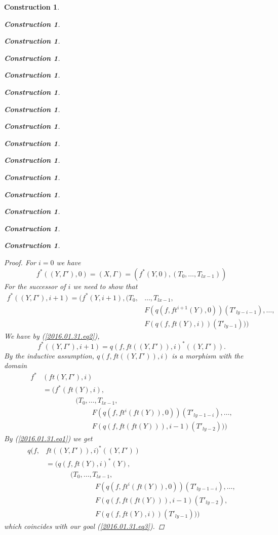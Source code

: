 \documentclass[onecolumn,12pt]{amsart}
\numberwithin{proposition}{subsection}
\newtheorem{construction}[proposition]{Construction}
\newcommand{\spc}{{\,\,\,\,\,\,\,}}
\begin{document}
\begin{construction}
\begin{construction}
\begin{construction}
\begin{construction}
\begin{construction}
\begin{construction}
\begin{construction}
\begin{construction}
\begin{construction}
\begin{construction}
\begin{construction}
\begin{construction}
\begin{construction}
\begin{construction}
\begin{construction}
\begin{proof}
For $i=0$ we have 
%
$$f^*((Y,\Gamma'),0)=(X,\Gamma)=(f^*(Y,0),(T_0,\dots,T_{lx-1}))$$
%
For the successor of $i$ we need to show that
%
\begin{equation}\label{2016.01.31.eq3}
  \begin{split}
    f^*((Y,\Gamma'),i+1)=(f^*(Y,i+1),(T_0,&\dots,T_{lx-1},
    \\
    &
    F(q(f,ft^{i+1}(Y),0))(T'_{ly-i-1}),\dots,
    \\
    &
    F(q(f,ft(Y),i))(T'_{ly-1})))
  \end{split}
\end{equation}%
%
We have by (\ref{2016.01.31.eq2}),  
%
$$f^*((Y,\Gamma'),i+1)=q(f,ft((Y,\Gamma')),i)^*((Y,\Gamma')).$$
%
By the inductive assumption, $q(f,ft((Y,\Gamma')),i)$ is a morphism with the domain
%
\begin{equation*}
  \begin{split}
    f^*&(ft(Y,\Gamma'),i)
    \\&=
    (f^*(ft(Y),i),
    \\&
       \spc\spc\spc\spc (T_0,\dots,T_{lx-1},
    \\&
          \spc\spc\spc\spc\spc\spc F(q(f,ft^{i}(ft(Y)),0))(T'_{ly-1-i}),\dots,
    \\&
          \spc\spc\spc\spc\spc\spc F(q(f,ft(ft(Y))),i-1)(T'_{ly-2})
          ))
  \end{split}
\end{equation*}
%
By (\ref{2016.01.31.eq1}) we get
%
\begin{equation*}
  \begin{split}
    q(f,&ft((Y,\Gamma')),i)^*((Y,\Gamma'))
    \\&=
    (q(f,ft(Y),i)^*(Y),
    \\&
    \spc\spc\spc (T_0,\dots,T_{lx-1},
    \\&
    \spc\spc\spc\spc\spc\spc F(q(f,ft^{i}(ft(Y)),0))(T'_{ly-1-i}),\dots,
    \\&
    \spc\spc\spc\spc\spc\spc F(q(f,ft(ft(Y))),i-1)(T'_{ly-2}),
    \\&
    \spc\spc\spc\spc\spc\spc F(q(f,ft(Y),i))(T'_{ly-1})))
  \end{split}
\end{equation*}
%
which coincides with our goal (\ref{2016.01.31.eq3}). 
\end{proof}
%


\end{construction}
\end{construction}
\end{construction}
\end{construction}
\end{construction}
\end{construction}
\end{construction}
\end{construction}
\end{construction}
\end{construction}
\end{construction}
\end{construction}
\end{construction}
\end{construction}
\end{construction}
\end{document}
